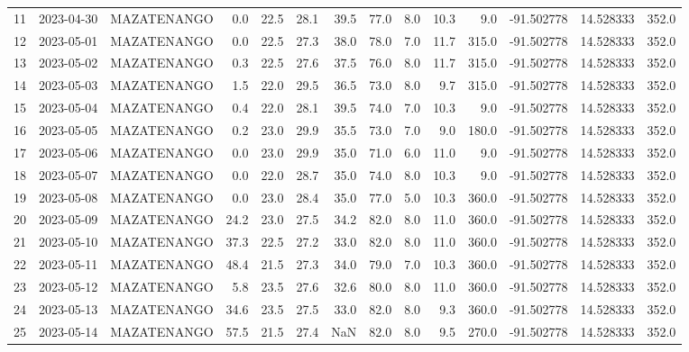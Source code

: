 \documentclass[12pt]{article}
\begin{document}
\begin{center}
\begin{tabular}{lllrrrrrrrrrrr}
11  & 2023-04-30 &  MAZATENANGO &     0.0 &  22.5 &   28.1 &  39.5 &     77.0 &  8.0 &        10.3 &         9.0 & -91.502778 &  14.528333 &    352.0 \\
12  & 2023-05-01 &  MAZATENANGO &     0.0 &  22.5 &   27.3 &  38.0 &     78.0 &  7.0 &        11.7 &       315.0 & -91.502778 &  14.528333 &    352.0 \\
13  & 2023-05-02 &  MAZATENANGO &     0.3 &  22.5 &   27.6 &  37.5 &     76.0 &  8.0 &        11.7 &       315.0 & -91.502778 &  14.528333 &    352.0 \\
14  & 2023-05-03 &  MAZATENANGO &     1.5 &  22.0 &   29.5 &  36.5 &     73.0 &  8.0 &         9.7 &       315.0 & -91.502778 &  14.528333 &    352.0 \\
15  & 2023-05-04 &  MAZATENANGO &     0.4 &  22.0 &   28.1 &  39.5 &     74.0 &  7.0 &        10.3 &         9.0 & -91.502778 &  14.528333 &    352.0 \\
16  & 2023-05-05 &  MAZATENANGO &     0.2 &  23.0 &   29.9 &  35.5 &     73.0 &  7.0 &         9.0 &       180.0 & -91.502778 &  14.528333 &    352.0 \\
17  & 2023-05-06 &  MAZATENANGO &     0.0 &  23.0 &   29.9 &  35.0 &     71.0 &  6.0 &        11.0 &         9.0 & -91.502778 &  14.528333 &    352.0 \\
18  & 2023-05-07 &  MAZATENANGO &     0.0 &  22.0 &   28.7 &  35.0 &     74.0 &  8.0 &        10.3 &         9.0 & -91.502778 &  14.528333 &    352.0 \\
19  & 2023-05-08 &  MAZATENANGO &     0.0 &  23.0 &   28.4 &  35.0 &     77.0 &  5.0 &        10.3 &       360.0 & -91.502778 &  14.528333 &    352.0 \\
20  & 2023-05-09 &  MAZATENANGO &    24.2 &  23.0 &   27.5 &  34.2 &     82.0 &  8.0 &        11.0 &       360.0 & -91.502778 &  14.528333 &    352.0 \\
21  & 2023-05-10 &  MAZATENANGO &    37.3 &  22.5 &   27.2 &  33.0 &     82.0 &  8.0 &        11.0 &       360.0 & -91.502778 &  14.528333 &    352.0 \\
22  & 2023-05-11 &  MAZATENANGO &    48.4 &  21.5 &   27.3 &  34.0 &     79.0 &  7.0 &        10.3 &       360.0 & -91.502778 &  14.528333 &    352.0 \\
23  & 2023-05-12 &  MAZATENANGO &     5.8 &  23.5 &   27.6 &  32.6 &     80.0 &  8.0 &        11.0 &       360.0 & -91.502778 &  14.528333 &    352.0 \\
24  & 2023-05-13 &  MAZATENANGO &    34.6 &  23.5 &   27.5 &  33.0 &     82.0 &  8.0 &         9.3 &       360.0 & -91.502778 &  14.528333 &    352.0 \\
25  & 2023-05-14 &  MAZATENANGO &    57.5 &  21.5 &   27.4 &   NaN &     82.0 &  8.0 &         9.5 &       270.0 & -91.502778 &  14.528333 &    352.0 \\
\bottomrule
\end{tabular}

        
        \end{center}
        
\end{document}
